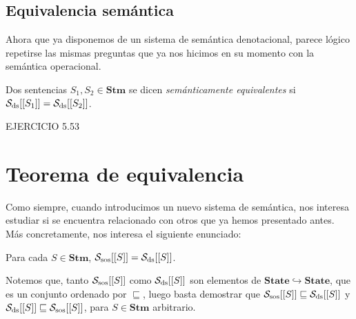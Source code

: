 \subsection{Equivalencia semántica}

Ahora que ya disponemos de un sistema de semántica denotacional, parece lógico repetirse las mismas preguntas que ya nos hicimos en su momento con la semántica operacional.

\begin{definition}
Dos sentencias $S_1, S_2 \in \mathbf{Stm}$ se dicen \textit{semánticamente equivalentes} si $\mathcal{S}_{\mathrm{ds}}[[S_1]] = \mathcal{S}_{\mathrm{ds}}[[S_2]]$.
\end{definition}

\begin{example}
EJERCICIO 5.53
\end{example}

\section{Teorema de equivalencia}

Como siempre, cuando introducimos un nuevo sistema de semántica, nos interesa estudiar si se encuentra relacionado con otros que ya hemos presentado antes. Más concretamente, nos interesa el siguiente enunciado:

\begin{theorem}
Para cada $S \in \mathbf{Stm}$, $\mathcal{S}_{\mathrm{sos}}[[S]] = \mathcal{S}_{\mathrm{ds}}[[S]]$.
\end{theorem}

Notemos que, tanto $\mathcal{S}_{\mathrm{sos}}[[S]]$ como $\mathcal{S}_{\mathrm{ds}}[[S]]$ son elementos de $\mathbf{State}\hookrightarrow\mathbf{State}$, que es un conjunto ordenado por $\sqsubseteq$, luego basta demostrar que $\mathcal{S}_{\mathrm{sos}}[[S]] \sqsubseteq \mathcal{S}_{\mathrm{ds}}[[S]]$ y $\mathcal{S}_{\mathrm{ds}}[[S]] \sqsubseteq \mathcal{S}_{\mathrm{sos}}[[S]]$, para $S \in \mathbf{Stm}$ arbitrario.